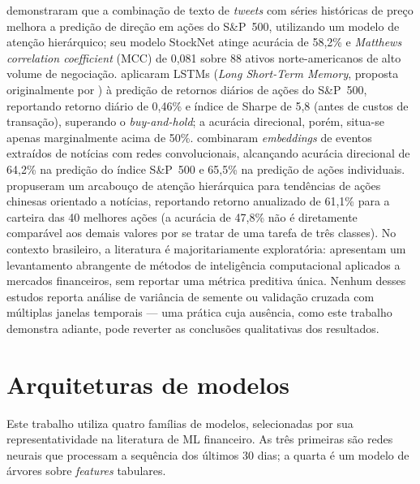  demonstraram que a combinação de texto de \textit{tweets} com séries históricas de preço melhora a predição de direção em ações do S\&P~500, utilizando um modelo de atenção hierárquico; seu modelo StockNet atinge acurácia de 58,2\% e \textit{Matthews correlation coefficient} (MCC) de 0,081 sobre 88 ativos norte-americanos de alto volume de negociação.  aplicaram LSTMs (\textit{Long Short-Term Memory}, proposta originalmente por ) à predição de retornos diários de ações do S\&P~500, reportando retorno diário de 0,46\% e índice de Sharpe de 5,8 (antes de custos de transação), superando o \textit{buy-and-hold}; a acurácia direcional, porém, situa-se apenas marginalmente acima de 50\%.  combinaram \textit{embeddings} de eventos extraídos de notícias com redes convolucionais, alcançando acurácia direcional de 64,2\% na predição do índice S\&P~500 e 65,5\% na predição de ações individuais.  propuseram um arcabouço de atenção hierárquica para tendências de ações chinesas orientado a notícias, reportando retorno anualizado de 61,1\% para a carteira das 40 melhores ações (a acurácia de 47,8\% não é diretamente comparável aos demais valores por se tratar de uma tarefa de três classes). No contexto brasileiro, a literatura é majoritariamente exploratória:  apresentam um levantamento abrangente de métodos de inteligência computacional aplicados a mercados financeiros, sem reportar uma métrica preditiva única.
Nenhum desses estudos reporta análise de variância de semente ou validação cruzada com múltiplas janelas temporais --- uma prática cuja ausência, como este trabalho demonstra adiante, pode reverter as conclusões qualitativas dos resultados.

\section{Arquiteturas de modelos}

Este trabalho utiliza quatro famílias de modelos, selecionadas por sua representatividade na literatura de ML financeiro. As três primeiras são redes neurais que processam a sequência dos últimos 30 dias; a quarta é um modelo de árvores sobre \textit{features} tabulares.

